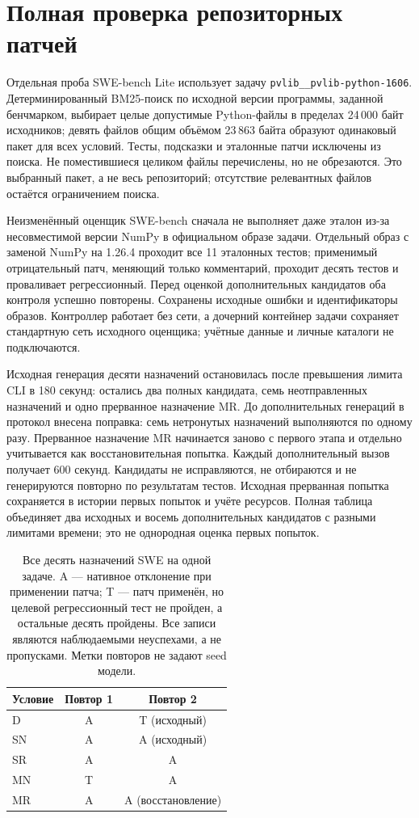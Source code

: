 \section{Полная проверка репозиторных патчей}
\label{sec:swe-dev1}

Отдельная проба SWE-bench Lite использует задачу \texttt{pvlib\_\_pvlib-python-1606}. Детерминированный BM25-поиск по исходной версии программы, заданной бенчмарком, выбирает целые допустимые Python-файлы в пределах 24\,000 байт исходников; девять файлов общим объёмом 23\,863 байта образуют одинаковый пакет для всех условий. Тесты, подсказки и эталонные патчи исключены из поиска. Не поместившиеся целиком файлы перечислены, но не обрезаются. Это выбранный пакет, а не весь репозиторий; отсутствие релевантных файлов остаётся ограничением поиска.

Неизменённый оценщик SWE-bench сначала не выполняет даже эталон из-за несовместимой версии NumPy в официальном образе задачи. Отдельный образ с заменой NumPy на 1.26.4 проходит все 11 эталонных тестов; применимый отрицательный патч, меняющий только комментарий, проходит десять тестов и проваливает регрессионный. Перед оценкой дополнительных кандидатов оба контроля успешно повторены. Сохранены исходные ошибки и идентификаторы образов. Контроллер работает без сети, а дочерний контейнер задачи сохраняет стандартную сеть исходного оценщика; учётные данные и личные каталоги не подключаются.

Исходная генерация десяти назначений остановилась после превышения лимита CLI в 180 секунд: остались два полных кандидата, семь неотправленных назначений и одно прерванное назначение MR. До дополнительных генераций в протокол внесена поправка: семь нетронутых назначений выполняются по одному разу. Прерванное назначение MR начинается заново с первого этапа и отдельно учитывается как восстановительная попытка. Каждый дополнительный вызов получает 600 секунд. Кандидаты не исправляются, не отбираются и не генерируются повторно по результатам тестов. Исходная прерванная попытка сохраняется в истории первых попыток и учёте ресурсов. Полная таблица объединяет два исходных и восемь дополнительных кандидатов с разными лимитами времени; это не однородная оценка первых попыток.

\begin{table}[t]
\centering
\caption{Все десять назначений SWE на одной задаче. A --- нативное отклонение при применении патча; T --- патч применён, но целевой регрессионный тест не пройден, а остальные десять пройдены. Все записи являются наблюдаемыми неуспехами, а не пропусками. Метки повторов не задают seed модели.}
\label{tab:swe-complete}
\begin{tabular*}{\linewidth}{@{\extracolsep{\fill}}lcc}
\hline
Условие & Повтор 1 & Повтор 2 \\
\hline
D  & A & T (исходный) \\
SN & A & A (исходный) \\
SR & A & A \\
MN & T & A \\
MR & A & A (восстановление) \\
\hline
\end{tabular*}
\end{table}

